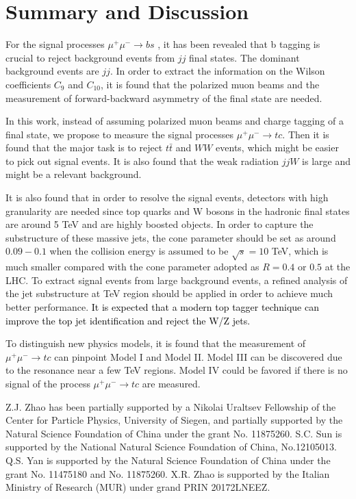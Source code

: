 \documentclass[a4paper,11pt]{article}
\begin{document}
\section{Summary and Discussion}\label{Sec:conc}
For the signal processes $\mu^+ \mu^- \to b s$ \cite{Altmannshofer:2022xri}, it has been revealed that b tagging is crucial to reject background events from $jj$ final states. The dominant background events are $j j$. In order to extract the information on the Wilson coefficients $C_{9}$ and $C_{10}$, it is found that the polarized muon beams and the measurement of forward-backward asymmetry of the final state are needed. 

In this work, instead of assuming polarized muon beams and charge tagging of a final state, we propose to measure the signal processes $\mu^+ \mu^- \to t c$. Then it is found that the major task is to reject $t \bar{t}$ and $ W W$ events, which might be easier to pick out signal events. It is also found that the weak radiation $ j j W$ is large and might be a relevant background.

It is also found that in order to resolve the signal events, detectors with high granularity are needed since top quarks and W bosons in the hadronic final states are around 5 TeV and are highly boosted objects. In order to capture the substructure of these massive jets, the cone parameter should be set as around  $0.09-0.1$ when the collision energy is assumed to be $\sqrt{s}=10$ TeV, which is much smaller compared with the cone parameter adopted as $R=0.4$ or $0.5$ at the LHC. To extract signal events from large background events, a refined analysis of the jet substructure at TeV region should be applied in order to achieve much better performance. \textcolor{black}{It is expected that a modern top tagger technique can improve the top jet identification and reject the W/Z jets.}


To distinguish new physics models, it is found that the measurement of  $\mu^+ \mu^- \to tc$ can pinpoint Model I and Model II. Model III can be discovered due to the resonance near a few TeV regions. Model IV could be favored if there is no signal of the process $\mu^+ \mu^- \to t c$ are measured.

	\begin{acknowledgments}
                Z.J. Zhao has been partially supported by a
		Nikolai Uraltsev Fellowship of the Center for Particle Physics,
		University of Siegen, and partially supported by the Natural Science
		Foundation of China under the grant No. 11875260. 
		S.C. Sun is supported by the National Natural Science Foundation of China, No.12105013.
		Q.S. Yan is supported by the Natural Science Foundation of China
		under the grant No.  11475180 and No. 11875260.
		X.R. Zhao is supported by the Italian Ministry of Research (MUR) under grand PRIN 20172LNEEZ.

	\end{acknowledgments}
\end{document}
